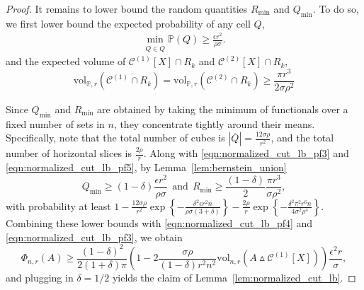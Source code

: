 \documentclass[11pt,twoside]{article}
\theoremstyle{definition}
\newcommand{\set}[1]{\left\{#1\right\}}
\newcommand{\vol}{\mathrm{vol}}
\newcommand{\abs}[1]{\left \lvert #1 \right \rvert}
\newcommand{\1}{\mathbbm{1}}
\newcommand{\Xbf}{X}
\newcommand{\Pbb}{\mathbb{P}}
\newcommand{\Cset}{\mathcal{C}}
\begin{document}
\begin{proof}
	It remains to lower bound the random quantities $R_{\min}$ and $Q_{\min}$.
	To do so, we first lower bound the expected probability of any cell $Q$,
	\begin{align*}
	\min_{Q \in \overline{Q}} \Pbb(Q) \geq \frac{\epsilon r^2}{\rho \sigma}.
	\end{align*}
	and the expected volume of $\Cset^{(1)}[\Xbf] \cap R_k$ and $\Cset^{(2)}[\Xbf] \cap R_k$,
	\begin{equation}
	\vol_{\Pbb,r}(\Cset^{(1)} \cap R_k) = \vol_{\Pbb,r}(\Cset^{(2)} \cap R_k) \geq \frac{\pi r^3}{2 \sigma \rho^2} \label{eqn:normalized_cut_lb_pf5}
	\end{equation}
	
	Since $Q_{\min}$ and $R_{\min}$ are obtained by taking the minimum of functionals over a fixed number of sets in $n$, they concentrate tightly around their means. Specifically, note that the total number of cubes is $\abs{\overline{Q}} = \frac{12 \sigma \rho}{r^2}$, and the total number of horizontal slices is $\frac{2\rho}{r}$. Along with \eqref{eqn:normalized_cut_lb_pf3} and \eqref{eqn:normalized_cut_lb_pf5}, by Lemma~\ref{lem:bernstein_union} 
	\begin{equation*}
	Q_{\min} \geq (1 - \delta)\frac{\epsilon r^2}{\rho \sigma} ~~\textrm{and}~~ R_{\min} \geq \frac{(1 - \delta)}{2}\frac{\pi r^3}{\sigma \rho^2 },
	\end{equation*}
	with probability at least $1 - \frac{12\sigma \rho}{r^2} \exp\set{-\frac{\delta^2\epsilon r^2 n}{\rho \sigma(3 + \delta)}} - \frac{2\rho}{r}\exp\set{-\frac{\delta^2\pi^2 r^6n}{4\sigma^2\rho^4}}$. Combining these lower bounds with \eqref{eqn:normalized_cut_lb_pf4} and \eqref{eqn:normalized_cut_lb_pf3}, we obtain
	\begin{equation*}	
	\Phi_{n,r}(A) \geq \frac{(1 - \delta)^2}{2(1 + \delta)\pi} \left(1 - 2 \frac{\sigma \rho}{(1 - \delta) r^2 n^2} \vol_{n,r}(A \vartriangle \Cset^{(1)}[\Xbf]) \right) \frac{\epsilon^2 r}{\sigma},
	\end{equation*}
	and plugging in $\delta = 1/2$ yields the claim of Lemma~\ref{lem:normalized_cut_lb}.
\end{proof}
\end{document}
